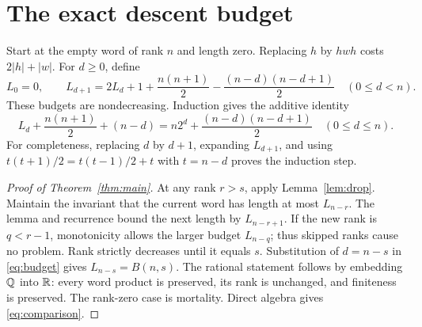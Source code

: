 \section{The exact descent budget}\label{sec:budget}
Start at the empty word of rank \(n\) and length zero. Replacing \(h\) by \(hwh\) costs \(2|h|+|w|\). For \(d\geq0\), define
\[
 L_0=0,\qquad L_{d+1}=2L_d+1+\frac{n(n+1)}2-
                  \frac{(n-d)(n-d+1)}2\quad(0\leq d<n).
\]
These budgets are nondecreasing. Induction gives the additive identity
\begin{equation}\label{eq:budget}
 L_d+\frac{n(n+1)}2+(n-d)
       =n2^d+\frac{(n-d)(n-d+1)}2\quad(0\leq d\leq n).
\end{equation}
For completeness, replacing \(d\) by \(d+1\), expanding \(L_{d+1}\), and using
\(t(t+1)/2=t(t-1)/2+t\) with \(t=n-d\) proves the induction step.

\begin{proof}[Proof of Theorem~\ref{thm:main}]
At any rank \(r>s\), apply Lemma~\ref{lem:drop}. Maintain the invariant that the current word has length at most \(L_{n-r}\). The lemma and recurrence bound the next length by \(L_{n-r+1}\). If the new rank is \(q<r-1\), monotonicity allows the larger budget \(L_{n-q}\); thus skipped ranks cause no problem. Rank strictly decreases until it equals \(s\). Substitution of \(d=n-s\) in \eqref{eq:budget} gives \(L_{n-s}=B(n,s)\). The rational statement follows by embedding \(\mathbb Q\) into \(\mathbb R\): every word product is preserved, its rank is unchanged, and finiteness is preserved. The rank-zero case is mortality. Direct algebra gives \eqref{eq:comparison}.
\end{proof}

